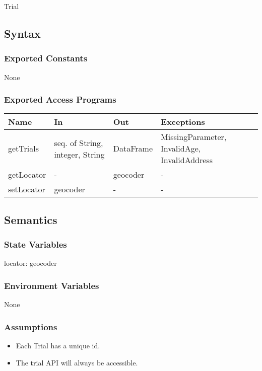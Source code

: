 \documentclass[12pt, titlepage]{article}
\begin{document}
Trial

\subsection{Syntax}

\subsubsection{Exported Constants}
None

\subsubsection{Exported Access Programs}

\begin{center}
\begin{tabular}{p{4cm} p{4cm} p{4cm} p{4cm}}
\hline
\textbf{Name} & \textbf{In} & \textbf{Out} & \textbf{Exceptions} \\
\hline
getTrials & seq. of String, integer, String & DataFrame & MissingParameter, InvalidAge, InvalidAddress \\
\hline
getLocator & - & geocoder & - \\
\hline
setLocator & geocoder & - & - \\
\hline
\end{tabular}
\end{center}

\subsection{Semantics}

\subsubsection{State Variables}
locator: geocoder \\

\subsubsection{Environment Variables}
None

\subsubsection{Assumptions}
\begin{itemize}
  \item Each Trial has a unique id.
  \item The trial API will always be accessible.
\end{itemize}
\end{document}
